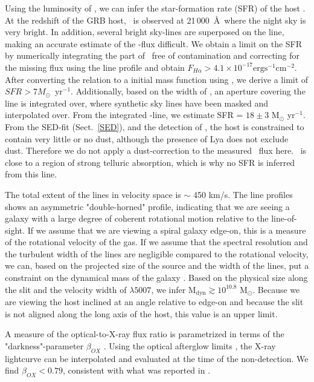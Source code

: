 \documentclass{aa}    %
\begin{document}
Using the luminosity of \ha, we can infer the star-formation rate (SFR) of the
host \citep{Kennicutt1998}. At the redshift of the GRB host, \ha~is observed
at 21\,000~\AA~where the night sky is very bright. In addition, several bright
sky-lines are superposed on the line, making an accurate estimate of the
\ha-flux difficult. We obtain a limit on the SFR by numerically integrating the
part of \ha~free of contamination and correcting for the missing flux using the
line profile and obtain $F_{H \alpha} > 4.1 \times 10^{-17} \mathrm{erg}
\mathrm{s}^{-1} \mathrm{cm}^{-2}$. After converting the \citet{Kennicutt1998}
relation to a \citet{Chabrier2003} initial mass function using
\citet{Madau2014}, we derive a limit of $SFR > 7 M_\odot$~yr$^{-1}$.
Additionally, based on the width of \oiii, an aperture covering the line is
integrated over, where synthetic sky lines \citep{Noll2012, Jones2013} have been
masked and interpolated over. From the integrated \ha-line, we estimate SFR =
$18 \pm 3$ M$_\odot$ yr$^{-1}$. From the SED-fit (Sect.~\ref{SED}), and the
detection of \lya, the host is constrained to contain very little or no dust,
although the presence of Lya does not exclude dust. Therefore we do not apply a
dust-correction to the measured \ha~flux here. \oii~is close to a region of
strong telluric absorption, which is why no SFR is inferred from this line.

The total extent of the lines in velocity space is $\sim$ 450 km/s. The line
profiles shows an asymmetric "double-horned" profile, indicating that we are
seeing a galaxy with a large degree of coherent rotational motion relative to
the line-of-sight. If we assume that we are viewing a spiral galaxy edge-on,
this is a measure of the rotational velocity of the gas. If we assume that the
spectral resolution and the turbulent width of the lines are negligible compared
to the rotational velocity, we can, based on the projected size of the source
and the width of the lines, put a constraint on the dynamical mass of the galaxy
\citep{DeBlok2014}. Based on the physical size along the slit and the velocity
width of \oiii$\lambda5007$, we infer M$_\text{dyn} \gtrsim 10^{10.8}$
M$_\odot$. Because we are viewing the host inclined at an angle relative to
edge-on and because the slit is not aligned along the long axis of the host,
this value is an upper limit. 

A measure of the optical-to-X-ray flux ratio is parametrized in terms of the
"darkness"-parameter $\beta_{OX} $ \citep{Jakobsson2004}. Using the optical
afterglow limits \citep{Cucchiara2011, Cenko2011}, the X-ray lightcurve can be
interpolated and evaluated at the time of the non-detection. We find $\beta_{OX}
< 0.79$, consistent with what was reported in \citet{Sakamoto2013}.
\end{document}
